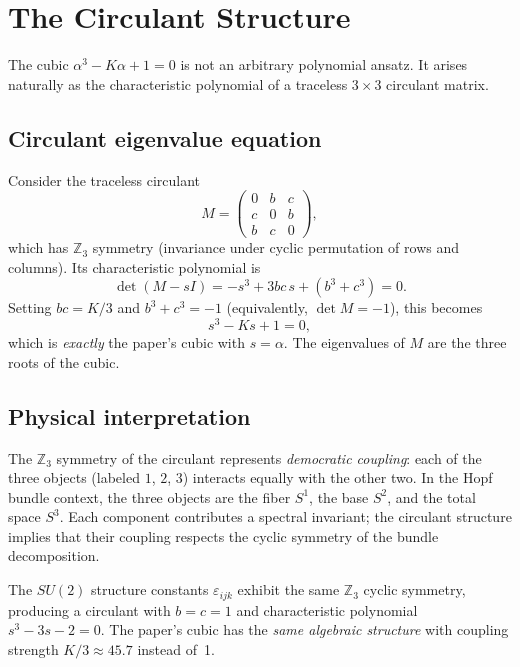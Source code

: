 \documentclass[aps,prl,twocolumn,superscriptaddress]{revtex4-2}
\begin{document}
\section{The Circulant Structure}

The cubic $\alpha^3 - K\alpha + 1 = 0$ is not an arbitrary polynomial
ansatz. It arises naturally as the characteristic polynomial of a
traceless $3 \times 3$ circulant matrix.

\subsection{Circulant eigenvalue equation}

Consider the traceless circulant
\begin{equation}\label{eq:circulant}
  M = \begin{pmatrix} 0 & b & c \\ c & 0 & b \\ b & c & 0
      \end{pmatrix},
\end{equation}
which has $\mathbb{Z}_3$ symmetry (invariance under cyclic permutation
of rows and columns). Its characteristic polynomial is
\begin{equation}
  \det(M - sI) = -s^3 + 3bc\,s + (b^3 + c^3) = 0.
\end{equation}
Setting $bc = K/3$ and $b^3 + c^3 = -1$ (equivalently,
$\det M = -1$), this becomes
\begin{equation}
  s^3 - Ks + 1 = 0,
\end{equation}
which is \textit{exactly} the paper's cubic with $s = \alpha$. The
eigenvalues of $M$ are the three roots of the cubic.

\subsection{Physical interpretation}

The $\mathbb{Z}_3$ symmetry of the circulant represents
\textit{democratic coupling}: each of the three objects (labeled $1$,
$2$, $3$) interacts equally with the other two. In the Hopf bundle
context, the three objects are the fiber $S^1$, the base $S^2$, and
the total space $S^3$. Each component contributes a spectral
invariant; the circulant structure implies that their coupling respects
the cyclic symmetry of the bundle decomposition.

The $SU(2)$ structure constants $\varepsilon_{ijk}$ exhibit the same
$\mathbb{Z}_3$ cyclic symmetry, producing a circulant with $b = c = 1$
and characteristic polynomial $s^3 - 3s - 2 = 0$. The paper's cubic
has the \textit{same algebraic structure} with coupling strength
$K/3 \approx 45.7$ instead of~1.
\end{document}
